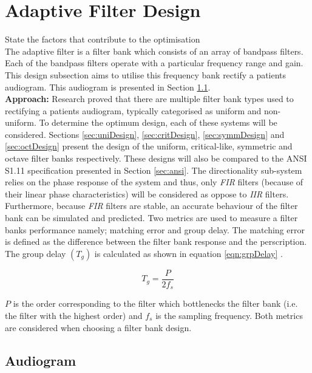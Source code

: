 \documentclass[11pt,onecolumn]{witseiepaper}
\begin{document}
\section{Adaptive Filter Design}

State the factors that contribute to the optimisation\\
\noindent The adaptive filter is a filter bank which consists of an array of bandpass filters. Each of the bandpass filters operate with a particular frequency range and gain. This design subsection aims to utilise this frequency bank rectify a patients audiogram. This audiogram is presented in Section \ref{sec:audiogram}.\\

\noindent \textbf{Approach:} Research proved that there are multiple filter bank types used to rectifying a patients audiogram, typically categorised as uniform and non-uniform. To determine the optimum design, each of these systems will be considered. Sections \ref{sec:uniDesign}, \ref{sec:critDesign}, \ref{sec:symmDesign} and \ref{sec:octDesign} present the design of the uniform, critical-like, symmetric and octave filter banks respectively. These designs will also be compared to the ANSI S1.11 specification presented in Section \ref{sec:ansi}. The directionality sub-system relies on the phase response of the system and thus, only \textit{FIR} filters (because of their linear phase characteristics) will be considered as oppose to \textit{IIR} filters. Furthermore, because \textit{FIR} filters are stable, an accurate behaviour of the filter bank can be simulated and predicted. Two metrics are used to measure a filter banks performance namely; matching error and group delay. The matching error is defined as the difference between the filter bank response and the perscription. The group delay $(T_g)$ is calculated as shown in equation \ref{eqn:grpDelay} \cite{chang}.

\begin{equation}
\label{eqn:grpDelay}
T_g = \frac{P}{2f_s}
\end{equation}

\noindent $P$ is the order corresponding to the filter which bottlenecks the filter bank (i.e. the filter with the highest order) and $f_s$ is the sampling frequency. Both metrics are considered when choosing a filter bank design.

\subsection{Audiogram}
\label{sec:audiogram}
\end{document}
